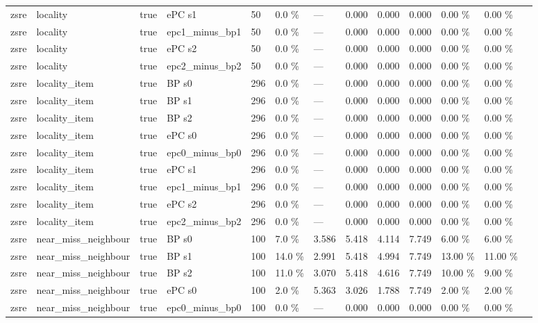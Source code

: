 \documentclass[10pt,a4paper]{article}
\begin{document}
\begin{center}
\begin{tabularx}{\textwidth}{@{}p{}XXXXXXXXXXXX@{}}
zsre & locality & true & ePC s1 & 50 & 0.0 \% & — & 0.000 & 0.000 & 0.000 & 0.00 \% & 0.00 \% &  \\
zsre & locality & true & epc1\_minus\_bp1 & 50 & 0.0 \% & — & 0.000 & 0.000 & 0.000 & 0.00 \% & 0.00 \% &  \\
zsre & locality & true & ePC s2 & 50 & 0.0 \% & — & 0.000 & 0.000 & 0.000 & 0.00 \% & 0.00 \% &  \\
zsre & locality & true & epc2\_minus\_bp2 & 50 & 0.0 \% & — & 0.000 & 0.000 & 0.000 & 0.00 \% & 0.00 \% &  \\
zsre & locality\_item & true & BP s0 & 296 & 0.0 \% & — & 0.000 & 0.000 & 0.000 & 0.00 \% & 0.00 \% &  \\
zsre & locality\_item & true & BP s1 & 296 & 0.0 \% & — & 0.000 & 0.000 & 0.000 & 0.00 \% & 0.00 \% &  \\
zsre & locality\_item & true & BP s2 & 296 & 0.0 \% & — & 0.000 & 0.000 & 0.000 & 0.00 \% & 0.00 \% &  \\
zsre & locality\_item & true & ePC s0 & 296 & 0.0 \% & — & 0.000 & 0.000 & 0.000 & 0.00 \% & 0.00 \% &  \\
zsre & locality\_item & true & epc0\_minus\_bp0 & 296 & 0.0 \% & — & 0.000 & 0.000 & 0.000 & 0.00 \% & 0.00 \% &  \\
zsre & locality\_item & true & ePC s1 & 296 & 0.0 \% & — & 0.000 & 0.000 & 0.000 & 0.00 \% & 0.00 \% &  \\
zsre & locality\_item & true & epc1\_minus\_bp1 & 296 & 0.0 \% & — & 0.000 & 0.000 & 0.000 & 0.00 \% & 0.00 \% &  \\
zsre & locality\_item & true & ePC s2 & 296 & 0.0 \% & — & 0.000 & 0.000 & 0.000 & 0.00 \% & 0.00 \% &  \\
zsre & locality\_item & true & epc2\_minus\_bp2 & 296 & 0.0 \% & — & 0.000 & 0.000 & 0.000 & 0.00 \% & 0.00 \% &  \\
zsre & near\_miss\_neighbour & true & BP s0 & 100 & 7.0 \% & 3.586 & 5.418 & 4.114 & 7.749 & 6.00 \% & 6.00 \% &  \\
zsre & near\_miss\_neighbour & true & BP s1 & 100 & 14.0 \% & 2.991 & 5.418 & 4.994 & 7.749 & 13.00 \% & 11.00 \% &  \\
zsre & near\_miss\_neighbour & true & BP s2 & 100 & 11.0 \% & 3.070 & 5.418 & 4.616 & 7.749 & 10.00 \% & 9.00 \% &  \\
zsre & near\_miss\_neighbour & true & ePC s0 & 100 & 2.0 \% & 5.363 & 3.026 & 1.788 & 7.749 & 2.00 \% & 2.00 \% &  \\
zsre & near\_miss\_neighbour & true & epc0\_minus\_bp0 & 100 & 0.0 \% & — & 0.000 & 0.000 & 0.000 & 0.00 \% & 0.00 \% &  \\

\end{tabularx}
\end{center}
\end{document}
